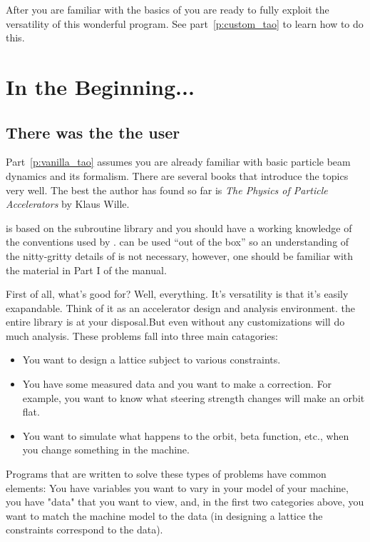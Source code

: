 After you are familiar with the basics of \tao you are ready to fully exploit
the versatility of this wonderful program. See part~\ref{p:custom_tao} to learn
how to do this.

\section{In the Beginning...}
\label{s:beginning}

\subsection{There was the the user}

Part~\ref{p:vanilla_tao} assumes you are already familiar with basic particle beam
dynamics and its formalism. There are several books that introduce the topics
very well. The best the author has found so far is \textit{The Physics of
Particle Accelerators} by Klaus Wille. 

\tao is based on the \bmad subroutine library and you should have
a working knowledge of the conventions used by \bmad. \tao can be used ``out of
the box'' so an understanding of the nitty-gritty details of \bmad is not
necessary, however, one should be familiar with the material in Part I
of the \bmad manual.

First of all, what's \tao good for? Well, everything. It's versatility is that
it's easily exapandable. Think of it as an accelerator design and analysis
environment. the entire \bmad library is at your disposal.But even without any 
customizations \tao will do much analysis. These problems fall into three main
catagories:

\begin{itemize}
\item 
You want to design a lattice subject to various constraints.
\item 
You have some measured data and you want to make a correction. For
example, you want to know what steering strength changes will make an orbit
flat.
\item
You want to simulate what happens to the orbit, beta function,
etc., when you change something in the machine.
\end{itemize}

Programs that are written to solve these types of problems have common
elements: You have variables you want to vary in your model of your
machine, you have "data" that you want to view, and, in the first two
categories above, you want to match the machine model to the data (in
designing a lattice the constraints correspond to the data).

